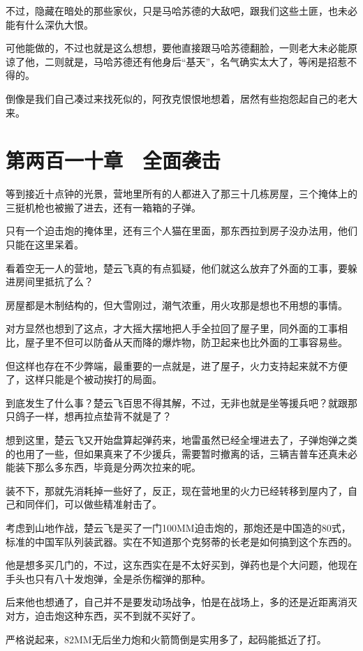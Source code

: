 不过，隐藏在暗处的那些家伙，只是马哈苏德的大敌吧，跟我们这些土匪，也未必能有什么深仇大恨。

可他能做的，不过也就是这么想想，要他直接跟马哈苏德翻脸，一则老大未必能原谅了他，二则就是，马哈苏德还有他身后“基天”，名气确实太大了，等闲是招惹不得的。

倒像是我们自己凑过来找死似的，阿孜克恨恨地想着，居然有些抱怨起自己的老大来。

\section{第两百一十章　全面袭击}

等到接近十点钟的光景，营地里所有的人都进入了那三十几栋房屋，三个掩体上的三挺机枪也被搬了进去，还有一箱箱的子弹。

只有一个迫击炮的掩体里，还有三个人猫在里面，那东西拉到房子没办法用，他们只能在这里呆着。

看着空无一人的营地，楚云飞真的有点狐疑，他们就这么放弃了外面的工事，要躲进房间里抵抗了么？

房屋都是木制结构的，但大雪刚过，潮气浓重，用火攻那是想也不用想的事情。

对方显然也想到了这点，才大摇大摆地把人手全拉回了屋子里，同外面的工事相比，屋子里不但可以防备从天而降的爆炸物，防卫起来也比外面的工事容易些。

但这样也存在不少弊端，最重要的一点就是，进了屋子，火力支持起来就不方便了，这样只能是个被动挨打的局面。

到底发生了什么事？楚云飞百思不得其解，不过，无非也就是坐等援兵吧？就跟那只鸽子一样，想再拉点垫背不就是了？

想到这里，楚云飞又开始盘算起弹药来，地雷虽然已经全埋进去了，子弹炮弹之类的也用了一些，但如果真来了不少援兵，需要暂时撤离的话，三辆吉普车还真未必能装下那么多东西，毕竟是分两次拉来的呢。

装不下，那就先消耗掉一些好了，反正，现在营地里的火力已经转移到屋内了，自己和同伴们，可以做些精准射击了。

考虑到山地作战，楚云飞是买了一门100MM迫击炮的，那炮还是中国造的80式，标准的中国军队列装武器。实在不知道那个克努蒂的长老是如何搞到这个东西的。

他是想多买几门的，不过，这东西实在是不太好买到，弹药也是个大问题，他现在手头也只有八十发炮弹，全是杀伤榴弹的那种。

后来他也想通了，自己并不是要发动场战争，怕是在战场上，多的还是近距离消灭对方，迫击炮这种东西，买不到就不买好了。

严格说起来，82MM无后坐力炮和火箭筒倒是实用多了，起码能抵近了打。

